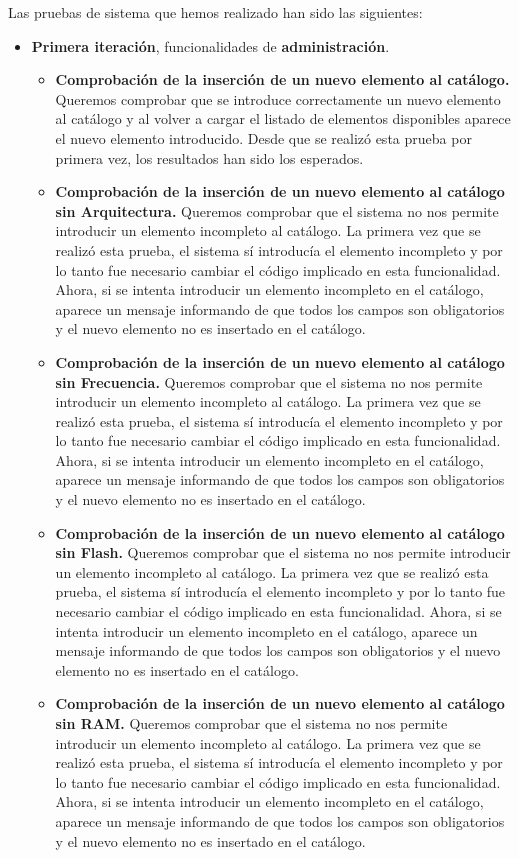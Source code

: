 Las pruebas de sistema que hemos realizado han sido las siguientes:
\begin{itemize}
\item \textbf{Primera iteración}, funcionalidades de \textbf{administración}.
	\begin{itemize}
	\item \textbf{Comprobación de la inserción de un nuevo elemento al catálogo.} Queremos comprobar que se introduce 				correctamente un nuevo elemento al catálogo y al volver a cargar el listado de elementos disponibles 			aparece el nuevo elemento introducido. Desde que se realizó esta prueba por primera vez, los resultados han sido los esperados.
	\item \textbf{Comprobación de la inserción de un nuevo elemento al catálogo sin Arquitectura.} Queremos comprobar que el sistema no nos permite introducir un elemento incompleto al catálogo. La primera vez que se realizó esta prueba, el sistema sí introducía el elemento incompleto y por lo tanto fue necesario cambiar el código implicado en esta funcionalidad. Ahora, si se intenta introducir un elemento incompleto en el catálogo, aparece un mensaje informando de que todos los campos son obligatorios y el nuevo elemento no es insertado en el catálogo.	
	\item \textbf{Comprobación de la inserción de un nuevo elemento al catálogo sin Frecuencia.} Queremos comprobar que el sistema no nos permite introducir un elemento incompleto al catálogo. La primera vez que se realizó esta prueba, el sistema sí introducía el elemento incompleto y por lo tanto fue necesario cambiar el código implicado en esta funcionalidad. Ahora, si se intenta introducir un elemento incompleto en el catálogo, aparece un mensaje informando de que todos los campos son obligatorios y el nuevo elemento no es insertado en el catálogo.	
	\item \textbf{Comprobación de la inserción de un nuevo elemento al catálogo sin Flash.} Queremos comprobar que el sistema no nos permite introducir un elemento incompleto al catálogo. La primera vez que se realizó esta prueba, el sistema sí introducía el elemento incompleto y por lo tanto fue necesario cambiar el código implicado en esta funcionalidad. Ahora, si se intenta introducir un elemento incompleto en el catálogo, aparece un mensaje informando de que todos los campos son obligatorios y el nuevo elemento no es insertado en el catálogo.
	\item \textbf{Comprobación de la inserción de un nuevo elemento al catálogo sin RAM.} Queremos comprobar que el sistema no nos permite introducir un elemento incompleto al catálogo. La primera vez que se realizó esta prueba, el sistema sí introducía el elemento incompleto y por lo tanto fue necesario cambiar el código implicado en esta funcionalidad. Ahora, si se intenta introducir un elemento incompleto en el catálogo, aparece un mensaje informando de que todos los campos son obligatorios y el nuevo elemento no es insertado en el catálogo.

\end{itemize}
\end{itemize}
